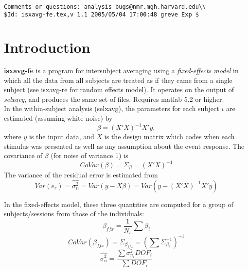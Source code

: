 \documentclass[10pt]{article}
\begin{document}
\begin{Large}
 \\
\end{Large}

\noindent 
\begin{verbatim}
Comments or questions: analysis-bugs@nmr.mgh.harvard.edu\\
$Id: isxavg-fe.tex,v 1.1 2005/05/04 17:00:48 greve Exp $
\end{verbatim}

\section{Introduction}
{\bf isxavg-fe} is a program for intersubject averaging using a {\em
fixed-effects model} in which all the data from all subjects are
treated as if they came from a single subject (see isxavg-re for
random effects model).  It operates on the output of {\em selxavg},
and produces the same set of files.  Requires matlab 5.2 or higher.\\

In the within-subject analysis (selxavg), the parameters for each
subject $i$ are estimated (assuming white noise) by
\begin{equation}
\beta = (X'X)^{-1}X'y,
\end{equation}
where $y$ is the input data, and $X$ is the design matrix which codes
when each stimulus was presented as well as any assumption about the
event response. The covariance of $\beta$ (for noise of variance 1) is 
\begin{equation}
CoVar(\beta) = \Sigma_{\beta} = (X'X)^{-1}
\end{equation}
The variance of the residual error is estimated from
\begin{equation}
Var(e_r) = \hat{\sigma_{n}^2} = Var(y-X\beta) = Var(y - (X'X)^{-1}X'y)
\end{equation}

In the fixed-effects model, these three quantities are computed for a
group of subjects/sessions from those of the individuals:
\begin{equation}
\beta_{ffx} = \frac{1}{N_s} \sum \beta_{i}
\end{equation}
\begin{equation}
CoVar(\beta_{ffx}) = \Sigma_{\beta_{ffx}} = (\sum \Sigma_{\beta_i}^{-1})^{-1}
\end{equation}
\begin{equation}
\hat{\sigma_{n}^2} = \frac{\sum{\sigma_{n_i}^2 DOF_i}} 
                          {\sum{DOF_i}}
\end{equation}
\end{document}

